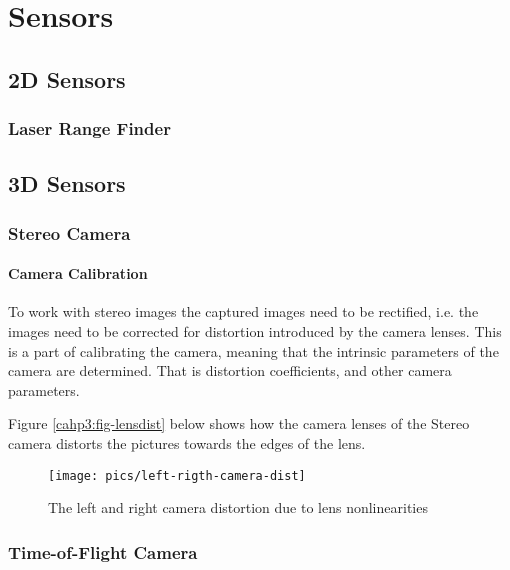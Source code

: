 

\chapter{Sensors}




\section{2D Sensors}

\subsection{Laser Range Finder}





\section{3D Sensors}


\subsection{Stereo Camera}



\subsubsection{Camera Calibration}
To work with stereo images the captured images need to be rectified, i.e. the images need
to be corrected for distortion introduced by the camera lenses. This is a part of
calibrating the camera, meaning that the intrinsic parameters of the camera are
determined. That is distortion coefficients, and other camera parameters. 

Figure \ref{cahp3:fig-lensdist} below shows how the camera lenses of the Stereo camera distorts the pictures
towards the edges of the lens. 

\begin{figure}[htbp]
    \centering
    \texttt{[image: pics/left-rigth-camera-dist]}
    \caption{The left and right camera distortion due to lens nonlinearities}
    \label{chap3:fig-lensdist}
\end{figure}



\subsection{Time-of-Flight Camera}




